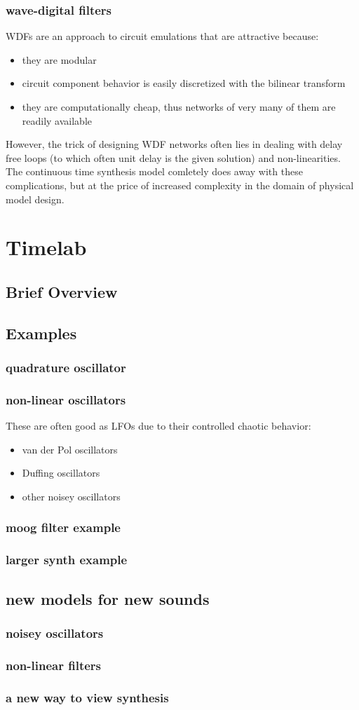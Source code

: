 \documentclass{article}
\begin{document}
\subsubsection{wave-digital filters}
WDFs are an approach to circuit emulations that are attractive because:
\begin{itemize}
\item they are modular
\item circuit component behavior is easily discretized with the bilinear transform
\item they are computationally cheap, thus networks of very many of them are readily available
\end{itemize}
However, the trick of designing WDF networks often lies in dealing with delay free loops (to which often unit delay is the given solution) and non-linearities. The continuous time synthesis model comletely does away with these complications, but at the price of increased complexity in the domain of physical model design.

\section{Timelab}
\subsection{Brief Overview}
\subsection{Examples}
\subsubsection{quadrature oscillator}
\subsubsection{non-linear oscillators}
These are often good as LFOs due to their controlled chaotic behavior:
\begin{itemize}

\item van der Pol oscillators
\item Duffing oscillators
\item other noisey oscillators
\end{itemize}
\subsubsection{moog filter example}
\subsubsection{larger synth example}
\subsection{new models for new sounds}
\subsubsection{noisey oscillators}
\subsubsection{non-linear filters}
\subsubsection{a new way to view synthesis}
\end{document}
